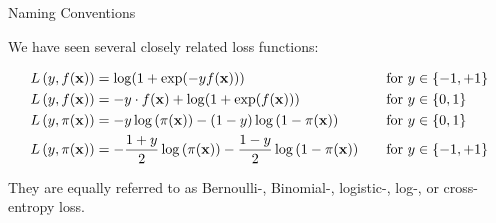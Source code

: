 \documentclass[11pt,compress,t,notes=noshow, xcolor=table]{beamer}
\begin{document}
\begin{vbframe}{Naming Conventions}

We have seen several closely related loss functions: %


\begin{alignat*}{3} L\left(y, f(\mathbf{x})\right)    &= \log(1+\exp(-yf(\mathbf{x}))) &&\quad \text{for } y \in \{-1, +1\} \\ L\left(y, f(\mathbf{x})\right)    &= - y \cdot f(\mathbf{x}) + \log(1 + \exp(f(\mathbf{x}))) &&\quad \text{for } y \in \{0, 1\} \\ L\left(y, \pi(\mathbf{x})\right)  &= - y \log \left(\pi(\mathbf{x})\right) - (1 - y) \log \left(1 - \pi(\mathbf{x})\right) &&\quad \text{for } y \in \{0, 1\} \\ L\left(y, \pi(\mathbf{x})\right)  &= - \frac{1 + y}{2} \log\left(\pi(\mathbf{x})\right) - \frac{1 - y}{2} \log\left(1 - \pi(\mathbf{x})\right) &&\quad \text{for } y \in \{-1, +1\} \end{alignat*}



\lz

They are equally referred to as Bernoulli-, Binomial-, logistic-, log-, or cross-entropy loss. %





\end{vbframe}
\end{document}
